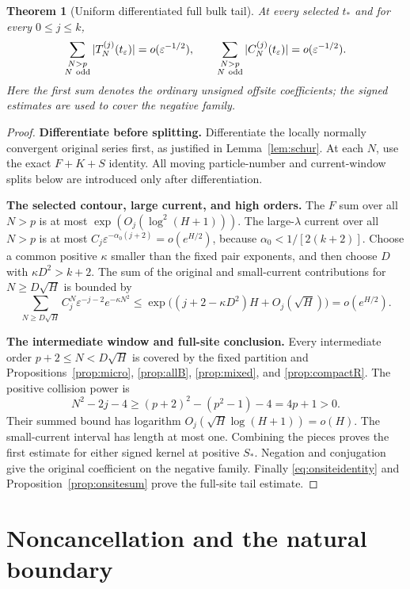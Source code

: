 \documentclass[11pt]{article}
\numberwithin{equation}{section}
\newtheorem{theorem}{Theorem}[section]
\theoremstyle{definition}
\newcommand{\eps}{\varepsilon}
\begin{document}
\begin{theorem}[Uniform differentiated full bulk tail]\label{thm:tail}
At every selected $t_*$ and for every $0\le j\le k$,
\[
 \sum_{\substack{N>p\\N\ {\rm odd}}}|T_N^{(j)}(t_\eps)|
 =o(\eps^{-1/2}),\qquad
 \sum_{\substack{N>p\\N\ {\rm odd}}}|C_N^{(j)}(t_\eps)|
 =o(\eps^{-1/2}).
\]
Here the first sum denotes the ordinary unsigned offsite coefficients;
the signed estimates are used to cover the negative family.
\end{theorem}
\begin{proof}
\noindent\textbf{Differentiate before splitting.} Differentiate the locally normally convergent original series first,
as justified in Lemma~\ref{lem:schur}. At each $N$, use the exact
$F+K+S$ identity. All moving particle-number and current-window
splits below are introduced only after differentiation.

\par\smallskip\noindent\textbf{The selected contour, large current, and high orders.} The $F$ sum over all $N>p$ is at most
$\exp(O_j(\log^2(H+1)))$. The large-$\lambda$ current over all
$N>p$ is at most $C_j\eps^{-\alpha_0(j+2)}=o(e^{H/2})$,
because $\alpha_0<1/[2(k+2)]$.
Choose a common positive $\kappa$ smaller than the fixed pair
exponents, and then choose $D$ with $\kappa D^2>k+2$.
The sum of the original and small-current contributions for
$N\ge D\sqrt H$ is bounded by
\[
 \sum_{N\ge D\sqrt H}C_j^N\eps^{-j-2}e^{-\kappa N^2}
 \le \exp\bigl((j+2-\kappa D^2)H+O_j(\sqrt H)\bigr)
 =o(e^{H/2}).
\]

\par\smallskip\noindent\textbf{The intermediate window and full-site conclusion.} Every intermediate order $p+2\le N<D\sqrt H$ is covered by the
fixed partition and Propositions~\ref{prop:micro}, \ref{prop:allB},
\ref{prop:mixed}, and \ref{prop:compactR}. The positive collision
power is
\[
 N^2-2j-4\ge(p+2)^2-(p^2-1)-4=4p+1>0.
\]
Their summed bound has logarithm
$O_j(\sqrt H\log(H+1))=o(H)$. The small-current interval has
length at most one. Combining the pieces proves the first estimate
for either signed kernel at positive $S_*$. Negation and
conjugation give the original coefficient on the negative family.
Finally \eqref{eq:onsiteidentity} and
Proposition~\ref{prop:onsitesum} prove the full-site tail estimate.
\end{proof}

\section{Noncancellation and the natural boundary}
\end{document}
